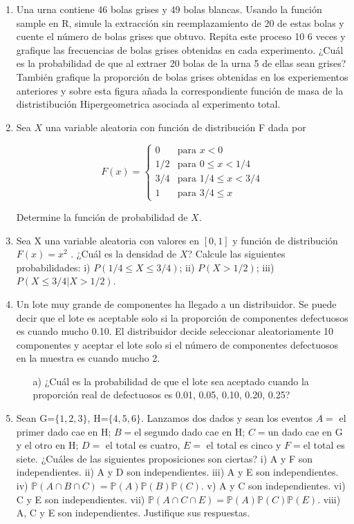 \documentclass[11pt,letterpaper]{article}
\newcommand{\mP}{\mathbb{P}}
\begin{document}
\begin{enumerate}
\item Una urna contiene 46 bolas grises y 49 bolas blancas. Usando la función sample en R, simule
la extracción sin reemplazamiento de 20 de estas bolas y cuente el número de bolas grises que
obtuvo. Repita este proceso 10 6 veces y grafique las frecuencias de bolas grises obtenidas en
cada experimento. ¿Cuál es la probabilidad de que al extraer 20 bolas de la urna 5 de ellas
sean grises? También grafique la proporción de bolas grises obtenidas en los experiementos
anteriores y sobre esta figura añada la correspondiente función de masa de la distristibución
Hipergeometrica asociada al experimento total.

\item Sea $X$ una variable aleatoria con función de distribución F dada por

\begin{equation*}
F(x) = \left\{\begin{array}{ll}
0 & \text{para } x<0\\
1/2 & \text{para } 0 \leq x <1/4\\
3/4 & \text{para } 1/4\leq x< 3/4\\
1 & \text{para } 3/4 \leq x
\end{array} \right.
\end{equation*}

Determine la función de probabilidad de $X$.


\item Sea X una variable aleatoria con valores en $[0, 1]$ y función de distribución $F(x)=x^2$ . ¿Cuál es
la densidad de $X$? Calcule las siguientes probabilidades: i) $P (1/4 \leq X \leq 3/4)$; ii) $P(X > 1/2)$;
iii) $P(X \leq 3/4|X > 1/2)$.

\item Un lote muy grande de componentes ha llegado a un distribuidor. Se puede decir que el
lote es aceptable solo si la proporción de componentes defectuosos es cuando mucho 0.10.
El distribuidor decide seleccionar aleatoriamente 10 componentes y aceptar el lote solo si el
número de componentes defectuosos en la muestra es cuando mucho 2.

\begin{itemize}
\item[a)] ¿Cuál es la probabilidad de que el lote sea aceptado cuando la proporción real de defectuosos es 0.01, 0.05, 0.10, 0.20, 0.25?
\end{itemize}

\item Sean G=$\{1, 2, 3\}$, H=$\{4, 5, 6\}$. Lanzamos dos dados y sean los eventos $A =$ el primer dado cae en H; $B=$el segundo dado cae en H; $C=$un dado cae en G y el otro en H; $D=$ el total es cuatro, $E=$ el total es cinco y $F=$el total es siete. ¿Cuáles de las siguientes proposiciones son ciertas? i) A y F son independientes. ii) A y D son independientes. iii) A
y E son independientes. iv) $\mP(A \cap B \cap C) = \mP (A)\mP (B)\mP (C)$. v) A y C son independientes.
vi) C y E son independientes. vii) $\mP (A \cap C \cap E) = \mP (A)\mP (C)\mP (E)$. viii) A, C y E son
independientes. Justifique sus respuestas.



\end{enumerate}
\end{document}
